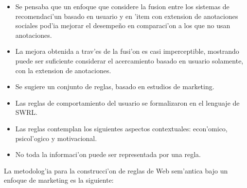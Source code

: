 \documentclass[11pt]{article}
\begin{document}
\begin{itemize}
\item Se pensaba que un enfoque que considere la fusion entre los sistemas de recomendaci'un basado en usuario y en 'item con extension de anotaciones sociales pod'ia mejorar el desempeño en comparaci'on a los que no usan anotaciones.
\item La mejora obtenida a trav'es de la fusi'on es casi imperceptible, mostrando puede ser suficiente considerar el acercamiento basado en usuario solamente, con la extension de anotaciones.
\item Se sugiere un conjunto de reglas, basado en estudios de marketing.
\item Las reglas de comportamiento del usuario se formalizaron en el lenguaje de SWRL.
\item Las reglas contemplan los siguientes aspectos contextuales: econ'omico, psicol'ogico y motivacional.
\item No toda la informaci'on puede ser representada por una regla.
\end{itemize}

La metodolog'ia para la construcci'on de reglas de Web sem'antica bajo un enfoque de marketing es la siguiente:
\end{document}
